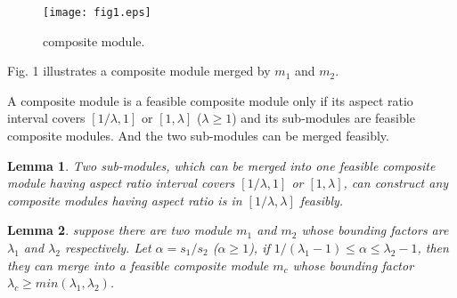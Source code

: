 \documentclass[conference]{IEEEtran}
\begin{document}
\begin{figure}[!t]
\centering
\texttt{[image: fig1.eps]}
\caption{composite module.}
\label{fig_sim}
\end{figure}

Fig. 1 illustrates a composite module merged by $m_1$ and $m_2$.


\begin{definition}
A composite module is a feasible composite module only if its aspect ratio interval covers $[1/\lambda,1]$ or $[1,\lambda]$ ($\lambda \ge 1$) and its sub-modules are feasible composite modules. And the two sub-modules can be merged feasibly.
\end{definition}

\newtheorem{lemma}{Lemma}
\begin{lemma}
Two sub-modules, which can be merged into one feasible composite module having aspect ratio interval covers $[1/\lambda,1]$ or $[1,\lambda]$, can construct any composite modules having aspect ratio is in $[1/\lambda,\lambda]$ feasibly.
\end{lemma}



\begin{lemma}
suppose there are two module $m_1$ and $m_2$ whose bounding factors are $\lambda_1$ and $\lambda_2$ respectively. Let $\alpha = s_1 / s_2$ ($\alpha \ge 1$), if $1/(\lambda_1-1) \le \alpha \le \lambda_2-1$, then they can merge into a feasible composite module $m_c$ whose bounding factor $\lambda_c \ge min(\lambda_1,\lambda_2)$.

\end{lemma}
\end{document}
